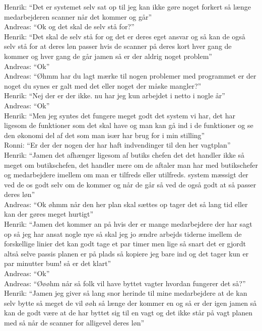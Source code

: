 Henrik: “Det er systemet selv sat op til jeg kan ikke gøre noget forkert så længe medarbejderen scanner når det kommer og går”\\
Andreas: “Ok og det skal de selv stå for?”\\
Henrik: “Det skal de selv stå for og det er deres eget ansvar og så kan de også selv stå for at deres løn passer hvis de scanner på deres kort hver gang de kommer og hver gang de går jamen så er der aldrig noget problem”\\
Andreas: “Ok”\\
Andreas: “Øhmm har du lagt mærke til nogen problemer med programmet er der noget du synes er galt med det eller noget der måske mangler?”\\
Henrik: “Nej der er der ikke. nu har jeg kun arbejdet i netto i nogle år”\\
Andreas: “Ok”\\
Henrik: “Men jeg syntes det fungere meget godt det system vi har, det har ligesom de funktioner som det skal have og man kan gå ind i de funktioner og se den økonomi del af det som man især har brug for i min stilling”\\
Ronni: “Er der der nogen der har haft indvendinger til den her vagtplan”\\
Henrik: “Jamen det afhænger ligesom af butiks chefen det det handler ikke så meget om butikschefen, det handler mere om de aftaler man har med butikschefer og medarbejdere imellem om man er tilfreds eller utilfreds. system mæssigt der ved de os godt selv om de kommer og når de går så ved de også godt at så passer deres løn”\\
Andreas: “Ok øhmm når den her plan skal sættes op tager det så lang tid eller kan der gøres meget hurtigt”\\
Henrik: “Jamen det kommer an på hvis der er mange medarbejdere der har sagt op så jeg har ansat nogle nye så skal jeg jo ændre arbejds tiderne imellem de forskellige linier det kan godt tage et par timer men lige så snart det er gjordt altså selve passis planen er på plads så kopiere jeg bare ind og det tager kun er par minutter bum! så er det klart”\\
Andreas: “Ok”\\
Andreas: “Øøøhm når så folk vil have byttet vagter hvordan fungerer det så?”\\
Henrik: “Jamen jeg giver så lang snor herinde til mine medarbejdere at de kan selv bytte så meget de vil øøh så længe der kommer en og så er der igen jamen så kan de godt være at de har byttet sig til en vagt og det ikke står på vagt planen med så når de scanner for alligevel deres løn”\\
